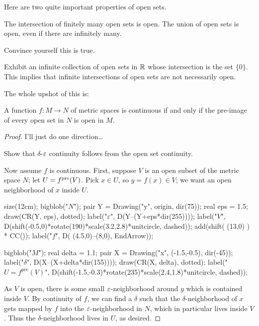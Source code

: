 Here are two quite important properties of open sets.
\begin{proposition}
	\listhack
	\begin{enumerate}[(a)]
		\ii The intersection of finitely many open sets is open.
		\ii The union of open sets is open, even if there are infinitely many.
	\end{enumerate}
\end{proposition}
\begin{ques}
	Convince yourself this is true.
\end{ques}
\begin{exercise}
	Exhibit an infinite collection of open sets in $\mathbb R$
	whose intersection is the set $\{0\}$.
	This implies that infinite intersections of open sets are not necessarily open.
\end{exercise}

The whole upshot of this is:
\begin{theorem}
	\label{thm:open_set}
	A function $f \colon M \to N$ of metric spaces is continuous
	if and only if the pre-image of every open set in $N$ is open in $M$.
\end{theorem}
\begin{proof}
	I'll just do one direction\dots
	\begin{exercise}
		Show that $\delta$-$\varepsilon$ continuity follows from
		the open set continuity.
	\end{exercise}
	Now assume $f$ is continuous.
	First, suppose $V$ is an open subset of the metric space $N$;
	let $U = f^{\text{pre}}(V)$. Pick $x \in U$, so $y = f(x) \in V$; we want an
	open neighborhood of $x$ inside $U$.

	\begin{center}
		\begin{asy}
			size(12cm);
			bigblob("$N$");
			pair Y = Drawing("y", origin, dir(75));
			real eps = 1.5;
			draw(CR(Y, eps), dotted);
			label("$\varepsilon$", D(Y--(Y+eps*dir(255))));
			label("$V$",
				D(shift(-0.5,0)*rotate(190)*scale(3.2,2.8)*unitcircle, dashed));
			add(shift( (13,0) ) * CC());
			label("$f$", D( (4.5,0)--(8,0), EndArrow));

			bigblob("$M$");
			real delta = 1.1;
			pair X = Drawing("x", (-1.5,-0.5), dir(-45));
			label("$\delta$", D(X--(X+delta*dir(155))));
			draw(CR(X, delta), dotted);
			label("$U = f^{\text{pre}}(V)$",
				D(shift(-1.5,-0.3)*rotate(235)*scale(2.4,1.8)*unitcircle, dashed));
		\end{asy}
	\end{center}

	As $V$ is open, there is some small $\varepsilon$-neighborhood around $y$
	which is contained inside $V$.
	By continuity of $f$, we can find a $\delta$ such that the $\delta$-neighborhood
	of $x$ gets mapped by $f$ into the $\varepsilon$-neighborhood in $N$,
	which in particular lives inside $V$.
	Thus the $\delta$-neighborhood lives in $U$, as desired.
\end{proof}

